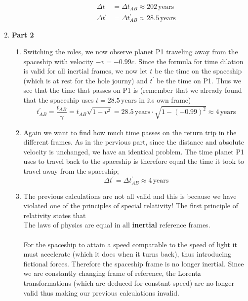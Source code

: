 \documentclass[a4paper,10pt,english]{article}
\begin{document}
\begin{enumerate}
\begin{enumerate}
\begin{align*}
\Delta t&=\Delta t_{AB}\approx202\,\text{years}\\
\Delta t^{\prime}&=\Delta t^{\prime}_{AB}\approx28.5\,\text{years}
\end{align*}

\end{enumerate}

\item \textbf{Part 2}

\begin{enumerate}

\item Switching the roles, we now observe planet P1 traveling away from the spaceship with velocity $-v=-0.99c$. Since the formula for time dilation is valid for all inertial frames, we now let $t$ be the time on the spaceship (which is at rest for the hole journy) and $t^{\prime}$ be the time on P1. Thus we see that the time that passes on P1 is (remember that we already found that the spaceship uses $t=28.5\,\text{years}$ in its own frame) \[t^{\prime}_{AB}=\frac{t_{AB}}{\gamma}=t_{AB}\sqrt{1-v^2}=28.5\,\text{years}\cdot\sqrt{1-(-0.99)^2}\approx4\,\text{years}\]


\item Again we want to find how much time passes on the return trip in the different frames. As in the pervious part, since the distance and absolute velocity is unchanged, we have an identical problem. The time planet P1 uses to travel back to the spaceship is therefore equal the time it took to travel away from the spaceship; 
\[\Delta t^{\prime}=\Delta t^{\prime}_{AB}\approx4\,\text{years}\]

\item The previous calculations are not all valid and this is because we have violated one of the\begingroup
\setlength\parindent{24pt} 
principles of special relativity! The first principle of relativity states that\\

The laws of physics are equal in all \textbf{inertial} reference frames.\\ \\
For the spaceship to attain a speed comparable to the speed of light it must accelerate (which it does when it turns back), thus introducing fictional forces. Therefore the spaceship frame is no longer inertial. Since we are constantly changing frame of reference, the Lorentz transformations (which are deduced for constant speed) are no longer valid thus making our previous calculations invalid.
\endgroup


\end{enumerate}
\end{enumerate}
\end{document}
